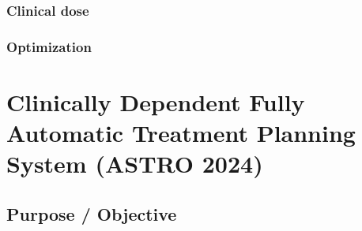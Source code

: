 \subsubsection*{Clinical dose}


\subsubsection*{Optimization}






\section{Clinically Dependent Fully Automatic Treatment Planning System (ASTRO 2024)}
\subsection{Purpose / Objective}

